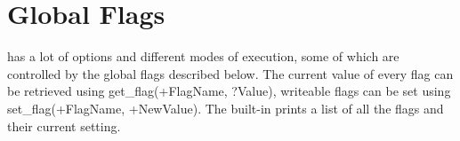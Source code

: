 %
%
%
%
%
%
%

\chapter{Global Flags}

{\eclipse} has a lot of options and different modes of execution,
some of which are controlled by the global flags described below.
The current value of every flag can be retrieved using
get_flag(+FlagName, ?Value), writeable flags can be set using
set_flag(+FlagName, +NewValue).
The built-in  prints a list of all the flags and their current
setting.


\newcommand{\idxnewitem}[1]{\index{#1}\item[#1]}

